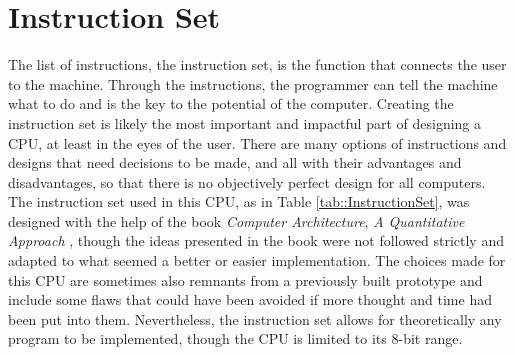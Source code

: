 \section{Instruction Set}
The list of instructions, the instruction set, is the function that connects the user to the machine. Through the instructions, the programmer can tell the machine what to do and is the key to the potential of the computer. Creating the instruction set is likely the most important and impactful part of designing a CPU, at least in the eyes of the user. There are many options of instructions and designs that need decisions to be made, and all with their advantages and disadvantages, so that there is no objectively perfect design for all computers. The instruction set used in this CPU, as in Table \ref{tab::InstructionSet}, was designed with the help of the book \textit{Computer Architecture}, \textit{A Quantitative Approach} \cite[Appendix A]{Computer_Architecture}, though the ideas presented in the book were not followed strictly and adapted to what seemed a better or easier implementation. The choices made for this CPU are sometimes also remnants from a previously built prototype and include some flaws that could have been avoided if more thought and time had been put into them. Nevertheless, the instruction set allows for theoretically any program to be implemented, though the CPU is limited to its 8-bit range.


